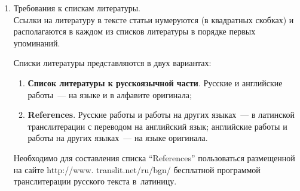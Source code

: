 {\begin{enumerate}[1.]
\begin{itemize}
{\sf http://www.ipiran.ru/journal/issues/2013\_07\_01\_eng/authors.asp};
\item аннотация (не менее 100~слов на каждом из языков). Аннотация~--- это краткое
резюме работы, которое может публиковаться отдельно. Она является основным
источником информации в~ин\-фор\-ма\-ци\-он\-ных системах и базах данных. Английская
аннотация должна быть оригинальной, может не быть дословным переводом русского
текста и должна быть написана хорошим английским языком. В~аннотации не должно
быть ссылок на литературу и, по возможности, формул;\\[-14.3pt]
\item ключевые слова~--- желательно из принятых в мировой
на\-уч\-но-тех\-ни\-че\-ской литературе тематических тезаурусов. Предложения не
могут быть ключевыми словами;\\[-14.3pt]
\item источники финансирования работы (ссылки на гранты, проекты,
поддерживающие организации и~т.\,п.).
\end{itemize}




\item  Требования к спискам литературы.\\[-13pt]

Ссылки на литературу в тексте статьи нумеруются (в квадратных скобках) и
располагаются в каждом из списков литературы в порядке  первых упоминаний.

Списки литературы представляются в двух вариантах:\\[-14pt]


\noindent
\begin{enumerate}[(1)]
\item \textbf{Список литературы к русскоязычной части}. Русские и английские
работы~---  на языке и в алфавите оригинала;\\[-14.5pt]
\item  \textbf{References}. Русские работы и работы на других языках~--- в латинской
транслитерации с переводом на английский язык; английские работы и работы на других
языках~--- на языке оригинала.
\end{enumerate}

Необходимо для составления списка ``References'' пользоваться размещенной на сайте
{\sf http://www. translit.net/ru/bgn/} бесплатной программой транслитерации русского
 текста в~латиницу. %


\end{enumerate}}
